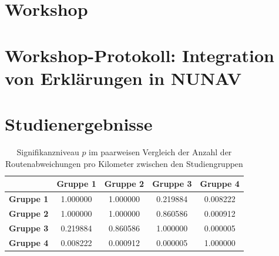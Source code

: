 \section{Workshop}

\section{Workshop-Protokoll: Integration von Erklärungen in NUNAV}
\label{sec:appendix_workshop_protocol}

\section{Studienergebnisse}
\label{sec:appendix_study_results}

\begin{table}
    \begin{center}
        \begin{tabular}{|c|c|c|c|c|}
            \hline
            & \textbf{Gruppe 1} & \textbf{Gruppe 2} & \textbf{Gruppe 3} & \textbf{Gruppe 4} \\ \hline
            \textbf{Gruppe 1}   & 1.000000 & 1.000000 & 0.219884 & 0.008222 \\ \hline
            \textbf{Gruppe 2}   & 1.000000 & 1.000000 & 0.860586 & 0.000912 \\ \hline
            \textbf{Gruppe 3}   & 0.219884 & 0.860586 & 1.000000 & 0.000005 \\ \hline
            \textbf{Gruppe 4}   & 0.008222 & 0.000912 & 0.000005 & 1.000000 \\ \hline
        \end{tabular}
    \end{center}
    
    \caption{Signifikanzniveau $ p $ im paarweisen Vergleich der Anzahl der Routenabweichungen pro Kilometer zwischen den Studiengruppen }
    \label{tab:study_offroute_significance_results}
\end{table}

